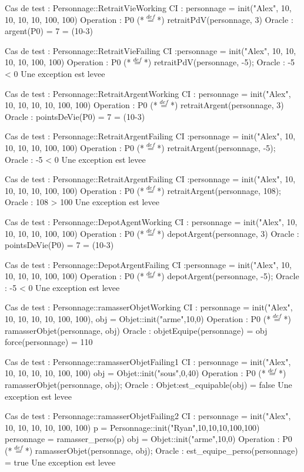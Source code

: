 \documentclass[a4paper, 11pt, notitlepage]{report}
\begin{document}
\begin{Test}
Cas de test : Personnage::RetraitVieWorking
CI : personnage = init("Alex", 10, 10, 10, 10, 100, 100)
Operation : P0 (*$\stackrel{def}{=}$*) retraitPdV(personnage, 3)
Oracle :
	argent(P0) = 7 = (10-3)

Cas de test : Personnage::RetraitVieFailing
CI :personnage = init("Alex", 10, 10, 10, 10, 100, 100)
Operation : P0 (*$\stackrel{def}{=}$*) retraitPdV(personnage, -5);
Oracle : 
	-5 < 0
	Une exception est levee
	
	
	Cas de test : Personnage::RetraitArgentWorking
CI : personnage = init("Alex", 10, 10, 10, 10, 100, 100)
Operation : P0 (*$\stackrel{def}{=}$*) retraitArgent(personnage, 3)
Oracle :
	pointsDeVie(P0) = 7 = (10-3)

Cas de test : Personnage::RetraitArgentFailing
CI :personnage = init("Alex", 10, 10, 10, 10, 100, 100)
Operation : P0 (*$\stackrel{def}{=}$*) retraitArgent(personnage, -5);
Oracle : 
	-5 < 0
	Une exception est levee
	
Cas de test : Personnage::RetraitArgentFailing
CI :personnage = init("Alex", 10, 10, 10, 10, 100, 100)
Operation : P0 (*$\stackrel{def}{=}$*) retraitArgent(personnage, 108);
Oracle : 
	108 > 100
	Une exception est levee
	
Cas de test : Personnage::DepotAgentWorking
CI : personnage = init("Alex", 10, 10, 10, 10, 100, 100)
Operation : P0 (*$\stackrel{def}{=}$*) depotArgent(personnage, 3)
Oracle :
	pointsDeVie(P0) = 7 = (10-3)

Cas de test : Personnage::DepotArgentFailing
CI :personnage = init("Alex", 10, 10, 10, 10, 100, 100)
Operation : P0 (*$\stackrel{def}{=}$*) depotArgent(personnage, -5);
Oracle : 
	-5 < 0
	Une exception est levee
	
Cas de test : Personnage::ramasserObjetWorking
CI : personnage = init("Alex", 10, 10, 10, 10, 100, 100),
		 obj = Objet::init("arme",10,0)
Operation : P0 (*$\stackrel{def}{=}$*) ramasserObjet(personnage, obj)
Oracle :
	objetEquipe(personnage) = obj
	force(personnage) = 110

Cas de test : Personnage::ramasserObjetFailing1
CI :	personnage = init("Alex", 10, 10, 10, 10, 100, 100)
			obj = Objet::init("sous",0,40)
Operation : P0 (*$\stackrel{def}{=}$*) ramasserObjet(personnage, obj);
Oracle : 
	Objet:est_equipable(obj) = false
	Une exception est levee

Cas de test : Personnage::ramasserObjetFailing2
CI :	personnage = init("Alex", 10, 10, 10, 10, 100, 100)
			p = Personnage::init("Ryan",10,10,10,100,100)
			personnage = ramasser_perso(p)
			obj = Objet::init("arme",10,0)
Operation : P0 (*$\stackrel{def}{=}$*) ramasserObjet(personnage, obj);
Oracle : 
	est_equipe_perso(personnage) = true
	Une exception est levee
	

\end{Test}
\end{document}
